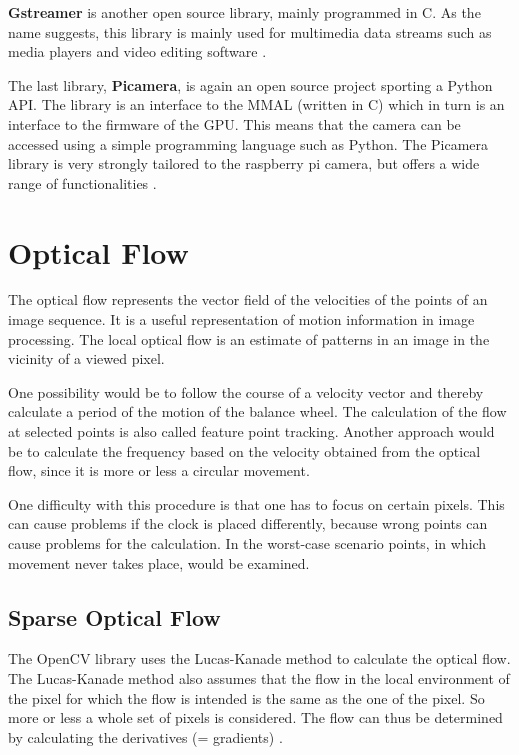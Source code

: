 \documentclass[12pt, a4paper]{report}
\begin{document}
\textbf{Gstreamer} is another open source library, mainly programmed in C. As the name suggests, this library is mainly used for multimedia data streams such as media players and video editing software \cite{gstreamer}.

\bigskip
The last library, \textbf{Picamera}, is again an open source project sporting a Python API. The library is an interface to the MMAL (written in C) which in turn is an interface to the firmware of the GPU. This means that the camera can be accessed using a simple programming language such as Python. The Picamera library is very strongly tailored to the raspberry pi camera, but offers a wide range of functionalities \cite[ch. 1]{ReadTheDocsPicamera}.
    
    \section{Optical Flow}
    The optical flow represents the vector field of the velocities of the points of an image sequence. It is a useful representation of motion information in image processing. The local optical flow is an estimate of patterns in an image in the vicinity of a viewed pixel. 
    
    One possibility would be to follow the course of a velocity vector and thereby calculate a period of the motion of the balance wheel. The calculation of the flow at selected points is also called feature point tracking. Another approach would be to calculate the frequency based on the velocity obtained from the optical flow, since it is more or less a circular movement. 
    
    One difficulty with this procedure is that one has to focus on certain pixels. This can cause problems if the clock is placed differently, because wrong points can cause problems for the calculation. In the worst-case scenario points, in which movement never takes place, would be examined.
    
    \subsection{Sparse Optical Flow}
    
    The OpenCV library uses the Lucas-Kanade method to calculate the optical flow. The Lucas-Kanade method also assumes that the flow in the local environment of the pixel for which the flow is intended is the same as the one of the pixel. So more or less a whole set of pixels is considered. The flow can thus be determined by calculating the derivatives (= gradients) \cite{opencv}.
    
\end{document}
